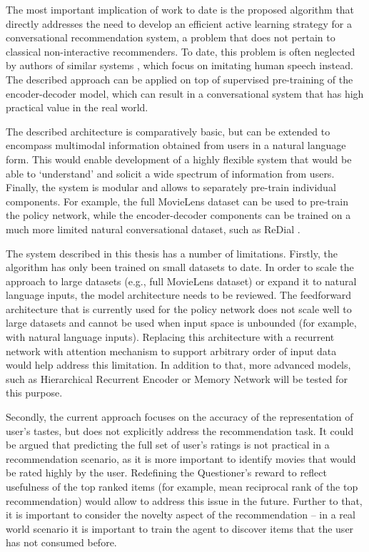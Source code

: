 The most important implication of work to date is the proposed algorithm that directly addresses the need to develop an efficient active learning strategy for a conversational recommendation system, a problem that does not pertain to classical non-interactive recommenders. To date, this problem is often neglected by authors of similar systems \citep{li2018towards, kang2019recommendation}, which focus on imitating human speech instead. The described approach can be applied on top of supervised pre-training of the encoder-decoder model, which can result in a conversational system that has high practical value in the real world.

The described architecture is comparatively basic, but can be extended to encompass multimodal information obtained from users in a natural language form. This would enable development of a highly flexible system that would be able to ‘understand’ and solicit a wide spectrum of information from users.
Finally, the system is modular and allows to separately pre-train individual components. For example, the full MovieLens dataset can be used to pre-train the policy network, while the encoder-decoder components can be trained on a much more limited natural conversational dataset, such as ReDial \citep{li2018towards}.

The system described in this thesis has a number of limitations. Firstly, the algorithm has only been trained on small datasets to date. In order to scale the approach to large datasets (e.g., full MovieLens dataset) or expand it to natural language inputs, the model architecture needs to be reviewed. The feedforward architecture that is currently used for the policy network does not scale well to large datasets and cannot be used when input space is unbounded (for example, with natural language inputs). Replacing this architecture with a recurrent network with attention mechanism to support arbitrary order of input data would help address this limitation. In addition to that, more advanced models, such as Hierarchical Recurrent Encoder or Memory Network \citep{das2017learning} will be tested for this purpose.

Secondly, the current approach focuses on the accuracy of the representation of user’s tastes, but does not explicitly address the recommendation task.  It could be argued that predicting the full set of user’s ratings is not practical in a recommendation scenario, as it is more important to identify movies that would be rated highly by the user. Redefining the Questioner’s reward to reflect usefulness of the top ranked items (for example, mean reciprocal rank of the top recommendation) would allow to address this issue in the future. Further to that, it is important to consider the novelty aspect of the recommendation -- in a real world scenario it is important to train the agent to discover items that the user has not consumed before.

